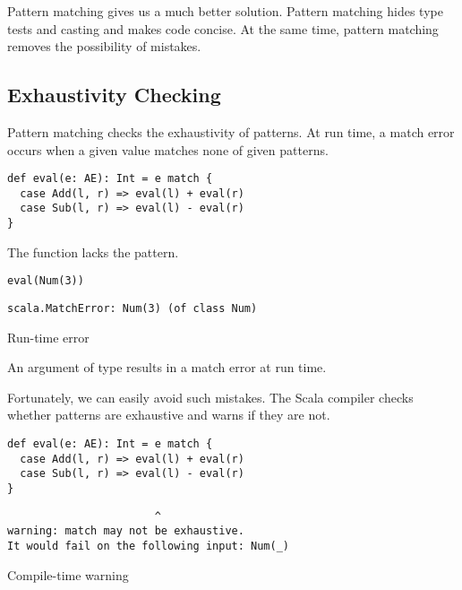 Pattern matching gives us a much better solution. Pattern matching hides type
tests and casting and makes code concise. At the same time, pattern matching
removes the possibility of mistakes.

\subsection{Exhaustivity Checking}

Pattern matching checks the exhaustivity of patterns. At run time, a match error
occurs when a given value matches none of given patterns.

\begin{verbatim}
def eval(e: AE): Int = e match {
  case Add(l, r) => eval(l) + eval(r)
  case Sub(l, r) => eval(l) - eval(r)
}
\end{verbatim}

The function lacks the  pattern.

\begin{verbatim}
eval(Num(3))
\end{verbatim}
\vspace{-1em}
\begin{mdframed}[hidealllines=true,backgroundcolor=red!10,innerleftmargin=3pt,innerrightmargin=3pt,leftmargin=-3pt,rightmargin=-3pt]
\begin{verbatim}
scala.MatchError: Num(3) (of class Num)
\end{verbatim}
\vspace{-2em}
\begin{flushright}
\scriptsize\textsf{Run-time error}
\end{flushright}
\end{mdframed}

An argument of type  results in a match error at run time.

Fortunately, we can easily avoid such mistakes.
The Scala compiler checks whether patterns are exhaustive and warns if they are not.

\begin{verbatim}
def eval(e: AE): Int = e match {
  case Add(l, r) => eval(l) + eval(r)
  case Sub(l, r) => eval(l) - eval(r)
}
\end{verbatim}
\vspace{-1em}
\begin{mdframed}[hidealllines=true,backgroundcolor=yellow!10,innerleftmargin=3pt,innerrightmargin=3pt,leftmargin=-3pt,rightmargin=-3pt]
\begin{verbatim}
                       ^
warning: match may not be exhaustive.
It would fail on the following input: Num(_)
\end{verbatim}
\vspace{-2em}
\begin{flushright}
\scriptsize\textsf{Compile-time warning}
\end{flushright}
\end{mdframed}

